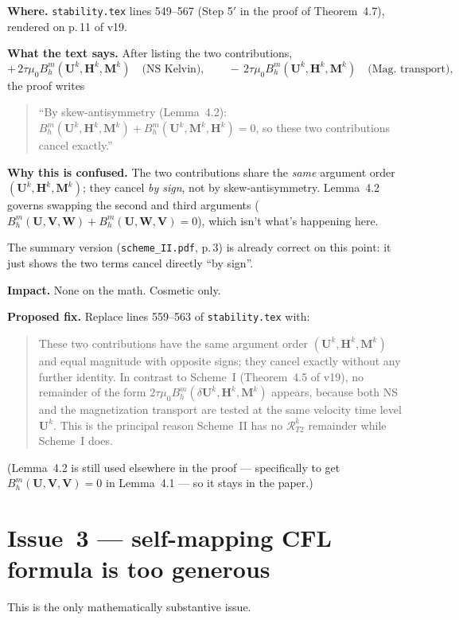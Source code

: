 \documentclass[11pt]{article}
\newcommand{\bM}{\mathbf{M}}
\newcommand{\bH}{\mathbf{H}}
\newcommand{\bU}{\mathbf{U}}
\newcommand{\bV}{\mathbf{V}}
\newcommand{\bW}{\mathbf{W}}
\newcommand{\Bhm}{B_h^{m}}
\newcommand{\dt}{\tau}
\begin{document}
\textbf{Where.}  \texttt{stability.tex} lines 549--567 (Step 5$'$ in
the proof of Theorem~4.7), rendered on p.\,11 of v19.

\textbf{What the text says.}  After listing the two contributions,
\[
+\,2\dt\mu_{0}\Bhm(\bU^{k},\bH^{k},\bM^{k})\quad\text{(NS Kelvin)},
\qquad
-\,2\dt\mu_{0}\Bhm(\bU^{k},\bH^{k},\bM^{k})\quad\text{(Mag.\ transport)},
\]
the proof writes
\begin{quote}
``By skew-antisymmetry (Lemma~4.2):
$\Bhm(\bU^k,\bH^k,\bM^k)+\Bhm(\bU^k,\bM^k,\bH^k)=0$, so these two
contributions cancel exactly.''
\end{quote}

\textbf{Why this is confused.}  The two contributions share the
\emph{same} argument order $(\bU^k,\bH^k,\bM^k)$; they cancel
\emph{by sign}, not by skew-antisymmetry.  Lemma~4.2 governs
swapping the second and third arguments
($\Bhm(\bU,\bV,\bW)+\Bhm(\bU,\bW,\bV)=0$), which isn't what's
happening here.

The summary version (\texttt{scheme\_II.pdf}, p.\,3) is already
correct on this point: it just shows the two terms cancel directly
``by sign''.

\textbf{Impact.}  None on the math.  Cosmetic only.

\textbf{Proposed fix.}  Replace lines 559--563 of
\texttt{stability.tex} with:

\begin{quote}
\noindent These two contributions have the same argument order
$(\bU^k,\bH^k,\bM^k)$ and equal magnitude with opposite signs;
they cancel exactly without any further identity.  In contrast to
Scheme~I (Theorem~4.5 of v19), no remainder of the form
$2\dt\mu_{0}\Bhm(\delta\bU^{k},\bH^{k},\bM^{k})$ appears, because
both NS and the magnetization transport are tested at the same
velocity time level $\bU^{k}$.  This is the principal reason
Scheme~II has no $\mathcal{R}_{T2}^{k}$ remainder while Scheme~I
does.
\end{quote}

(Lemma~4.2 is still used elsewhere in the proof --- specifically to
get $\Bhm(\bU,\bV,\bV)=0$ in Lemma~4.1 --- so it stays in the
paper.)

\section{Issue~3 --- self-mapping CFL formula is too generous}

This is the only mathematically substantive issue.
\end{document}
